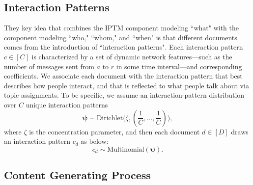 \documentclass{article}
\begin{document}
\subsection{Interaction Patterns}\label{subsec:Interaction patterns}
They key idea that combines the IPTM component modeling ``what" with
the component modeling ``who," ``whom," and ``when" is that different
documents comes from the introduction of ``interaction patterns".  Each interaction pattern $c \in [C]$ is characterized by a set of dynamic network features---such as the number of messages sent from $a$ to $r$ in some time interval---and corresponding coefficients. We associate each document with the interaction pattern that best describes how people interact, and that is reflected to what people talk about via topic assignments. To be specific, we assume an interaction-pattern distribution over $C$ unique interaction patterns
\begin{equation}
	\boldsymbol{\psi}\sim \mbox{Dirichlet}\Big(\zeta, (\frac{1}{C},\ldots,\frac{1}{C})\Big),
\end{equation}
where $\zeta$ is the concentration parameter, and then each document $d \in [D]$ draws an interaction pattern $c_d$ as below:
\begin{equation}
c_d\sim \mbox{Multinomial}(\boldsymbol{\psi}).
\end{equation}


\subsection{Content Generating Process}\label{subsec:Content generating process}
\end{document}
